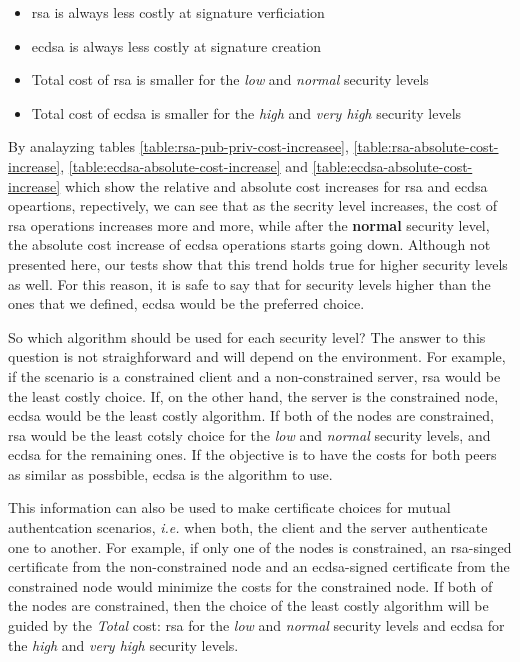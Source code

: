 \documentclass{llncs}
\begin{document}
\begin{itemize}
  \item \gls{rsa} is always less costly at signature verficiation
  \item \gls{ecdsa} is always less costly at signature creation
  \item Total cost of \gls{rsa} is smaller for the \textit{low} and \textit{normal} security levels
  \item Total cost of \gls{ecdsa} is smaller for the \textit{high} and \textit{very high} security levels
\end{itemize}

By analayzing tables \ref{table:rsa-pub-priv-cost-increasee}, \ref{table:rsa-absolute-cost-increase}, \ref{table:ecdsa-absolute-cost-increase} and
\ref{table:ecdsa-absolute-cost-increase} which show the relative and absolute cost increases for \gls{rsa} and \gls{ecdsa} opeartions, repectively,
we can see that as the secrity level increases, the cost of \gls{rsa} operations increases more and more, while after the \textbf{normal} security
level, the absolute cost increase of \gls{ecdsa} operations starts going down. Although not presented here, our tests show that this trend holds true
for higher security levels as well. For this reason, it is safe to say that for security levels higher than the ones that we defined,
\gls{ecdsa} would be the preferred choice.

So which algorithm should be used for each security level? The answer to this question is not straighforward and will depend on the environment.
For example, if the scenario is a constrained client and a non-constrained server, \gls{rsa} would be the least costly choice. If, on the
other hand, the server is the constrained node, \gls{ecdsa} would be the least costly algorithm. If both of the nodes are
constrained, \gls{rsa} would be the least cotsly choice for the \textit{low} and \textit{normal} security levels, and \gls{ecdsa} for the remaining ones. 
If the objective is  to have the costs for both peers as similar as possbible, \gls{ecdsa} is the algorithm to use.

This information can also be used to make
certificate choices for mutual authentcation scenarios, \textit{i.e.} when both, the client and the server authenticate one to another.
For example, if only one of the nodes is constrained, an \gls{rsa}-singed certificate from the non-constrained node and an \gls{ecdsa}-signed
certificate from the constrained node would minimize the costs for the constrained node. If both of the nodes are constrained, then the
choice of the least costly algorithm will be guided by the \textit{Total} cost: \gls{rsa} for the \textit{low} and \textit{normal}
security levels and \gls{ecdsa} for the \textit{high} and \textit{very high} security levels.
\end{document}
